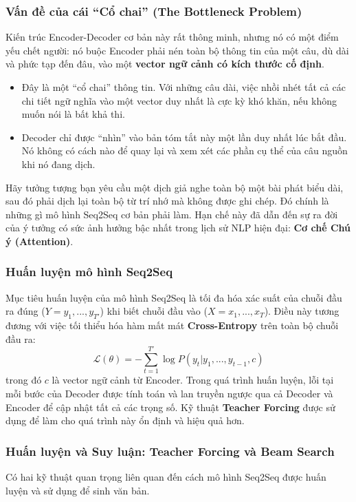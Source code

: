 \subsubsection{Vấn đề của cái “Cổ chai” (The Bottleneck Problem)}
Kiến trúc Encoder-Decoder cơ bản này rất thông minh, nhưng nó có một điểm yếu chết người: nó buộc Encoder phải nén toàn bộ thông tin của một câu, dù dài và phức tạp đến đâu, vào một \textbf{vector ngữ cảnh có kích thước cố định}.
\begin{itemize}
    \item Đây là một “cổ chai” thông tin. Với những câu dài, việc nhồi nhét tất cả các chi tiết ngữ nghĩa vào một vector duy nhất là cực kỳ khó khăn, nếu không muốn nói là bất khả thi.
    \item Decoder chỉ được “nhìn” vào bản tóm tắt này một lần duy nhất lúc bắt đầu. Nó không có cách nào để quay lại và xem xét các phần cụ thể của câu nguồn khi nó đang dịch.
\end{itemize}
Hãy tưởng tượng bạn yêu cầu một dịch giả nghe toàn bộ một bài phát biểu dài, sau đó phải dịch lại toàn bộ từ trí nhớ mà không được ghi chép. Đó chính là những gì mô hình Seq2Seq cơ bản phải làm. Hạn chế này đã dẫn đến sự ra đời của ý tưởng có sức ảnh hưởng bậc nhất trong lịch sử NLP hiện đại: \textbf{Cơ chế Chú ý (Attention)}.

\subsubsection{Huấn luyện mô hình Seq2Seq}
Mục tiêu huấn luyện của mô hình Seq2Seq là tối đa hóa xác suất của chuỗi đầu ra đúng ($Y = y_1, ..., y_{T'}$) khi biết chuỗi đầu vào ($X = x_1, ..., x_T$). Điều này tương đương với việc tối thiểu hóa hàm mất mát \textbf{Cross-Entropy} trên toàn bộ chuỗi đầu ra:
$$ \mathcal{L}(\theta) = - \sum_{t=1}^{T'} \log P(y_t | y_1, ..., y_{t-1}, c) $$
trong đó $c$ là vector ngữ cảnh từ Encoder. Trong quá trình huấn luyện, lỗi tại mỗi bước của Decoder được tính toán và lan truyền ngược qua cả Decoder và Encoder để cập nhật tất cả các trọng số. Kỹ thuật \textbf{Teacher Forcing} được sử dụng để làm cho quá trình này ổn định và hiệu quả hơn.

\subsubsection{Huấn luyện và Suy luận: Teacher Forcing và Beam Search}
Có hai kỹ thuật quan trọng liên quan đến cách mô hình Seq2Seq được huấn luyện và sử dụng để sinh văn bản.

